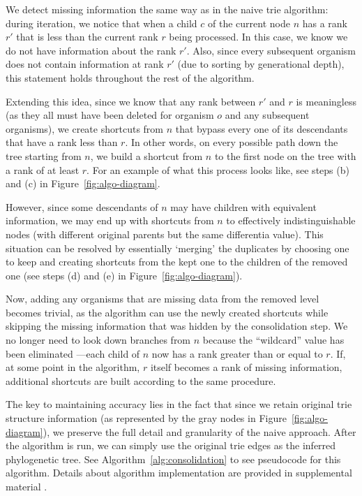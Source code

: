 We detect missing information the same way as in the naive trie algorithm: during iteration, we notice that when a child $c$ of the current node $n$ has a rank $r'$ that is less than the current rank $r$ being processed.
In this case, we know we do not have information about the rank $r'$.
Also, since every subsequent organism does not contain information at rank $r'$ (due to sorting by generational depth), this statement holds throughout the rest of the algorithm.



Extending this idea, since we know that any rank between $r'$ and $r$ is meaningless (as they all must have been deleted for organism $o$ and any subsequent organisms), we create shortcuts from $n$ that bypass every one of its descendants that have a rank less than $r$.
In other words, on every possible path down the tree starting from $n$, we build a shortcut from $n$ to the first node on the tree with a rank of at least $r$. For an example of what this process looks like, see steps (b) and (c) in Figure~\ref{fig:algo-diagram}.

However, since some descendants of $n$ may have children with equivalent information, we may end up with shortcuts from $n$ to effectively indistinguishable nodes (with different original parents but the same differentia value).
This situation can be resolved by essentially `merging' the duplicates by choosing one to keep and creating shortcuts from the kept one to the children of the removed one (see steps (d) and (e) in Figure~\ref{fig:algo-diagram}).

Now, adding any organisms that are missing data from the removed level becomes trivial, as the algorithm can use the newly created shortcuts while skipping the missing information that was hidden by the consolidation step.
We no longer need to look down branches from $n$ because the ``wildcard'' value has been eliminated ---each child of $n$ now has a rank greater than or equal to $r$.
If, at some point in the algorithm, $r$ itself becomes a rank of missing information, additional shortcuts are built according to the same procedure.



The key to maintaining accuracy lies in the fact that since we retain original trie structure information (as represented by the gray nodes in Figure~\ref{fig:algo-diagram}), we preserve the full detail and granularity of the naive approach.
After the algorithm is run, we can simply use the original trie edges as the inferred phylogenetic tree.
See Algorithm~\ref{alg:consolidation} to see pseudocode for this algorithm.
Details about algorithm implementation are provided in supplemental material \citep{supplemental}.
